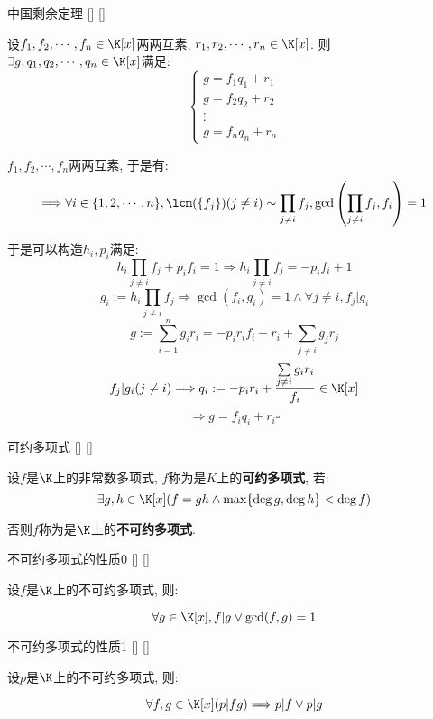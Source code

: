 \documentclass[UTF8]{ctexart}
\begin{document}
		\begin{thm}
			[]
			{中国剩余定理}
			[]
			[]
			
			设$f_1,f_2,\cdots,f_n\in\K[x]$两两互素, $r_1,r_2,\cdots,r_n\in\K[x]$. 则$\exists g,q_1,q_2,\cdots,q_n\in\K[x]$满足: 
			\[\begin{cases}
				g=f_1 q_1+r_1\\
				g=f_2 q_2+r_2\\
				\vdots\\
				g=f_n q_n+r_n
			\end{cases}\]
		\end{thm}
  
        \begin{prf}
			$f_1,f_2,\cdots,f_n$两两互素, 于是有: 
			\[\Longrightarrow\forall i\in\{1,2,\cdots,n\}, \lcm(\{f_j\})(j\neq i)\sim\prod\limits_{j\neq i}f_j, \gcd\left(\prod\limits_{j\neq i}f_j,f_i\right)=1\]

			于是可以构造$h_i,p_i$满足: 
			\[h_i\prod_{j\neq i}f_j+p_i f_i=1\Longrightarrow h_i\prod_{j\neq i}f_j=-p_i f_i+1\]
			\[g_i:=h_i\prod_{j\neq i}f_j\Longrightarrow\gcd(f_i,g_i)=1\wedge\forall j\neq i, f_j|g_i\]
			\[g:=\sum_{i=1}^n g_i r_i=-p_i r_i f_i+r_i+\sum_{j\neq i}g_j r_j\]
			\[f_j|g_i(j\neq i)\Longrightarrow q_i:=-p_i r_i+\frac{\sum\limits_{j\neq i}g_ir_i}{f_i}\in\K[x]\]
			\[\Longrightarrow g=f_i q_i+r_i\square\]
        \end{prf}
        
		\begin{dfn}
			[]
			{可约多项式}
			[]
			[]

			设$f$是$\K$上的非常数多项式, $f$称为是$K$上的\textbf{可约多项式}, 若: 
			\[\exists g,h\in\K[x](f=gh\wedge\max\{\deg g, \deg h\}<\deg f)\]
			
			否则$f$称为是$\K$上的\textbf{不可约多项式}. 
		\end{dfn}
		
		\begin{ppt}
			[]
			{不可约多项式的性质0}
			[]
			[]

			设$f$是$\K$上的不可约多项式, 则: 
			
			\[\forall g\in\K[x], f|g\vee\gcd(f,g)=1\]
		\end{ppt}
		
		\begin{ppt}
			[]
			{不可约多项式的性质1}
			[]
			[]

			设$p$是$\K$上的不可约多项式, 则: 

			\[\forall f,g\in\K[x](p|fg)\Longrightarrow p|f\vee p|g\]
		\end{ppt}
		
\end{document}
